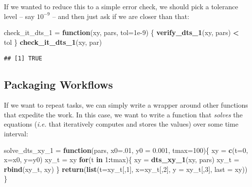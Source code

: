 \documentclass[
]{book}
\newenvironment{Shaded}{\begin{snugshade}}{\end{snugshade}}
\newcommand{\AttributeTok}[1]{\textcolor[rgb]{0.13,0.29,0.53}{#1}}
\newcommand{\ControlFlowTok}[1]{\textcolor[rgb]{0.13,0.29,0.53}{\textbf{#1}}}
\newcommand{\DecValTok}[1]{\textcolor[rgb]{0.00,0.00,0.81}{#1}}
\newcommand{\FloatTok}[1]{\textcolor[rgb]{0.00,0.00,0.81}{#1}}
\newcommand{\FunctionTok}[1]{\textcolor[rgb]{0.13,0.29,0.53}{\textbf{#1}}}
\newcommand{\NormalTok}[1]{#1}
\newcommand{\OtherTok}[1]{\textcolor[rgb]{0.56,0.35,0.01}{#1}}
\newcommand{\SpecialCharTok}[1]{\textcolor[rgb]{0.81,0.36,0.00}{\textbf{#1}}}
\begin{document}
If we wanted to reduce this to a simple error check, we should pick a tolerance level -- say \(10^{-9}\) -- and then just ask if we are closer than that:

\begin{Shaded}
\begin{Highlighting}[]
\NormalTok{check\_it\_dts\_1 }\OtherTok{=} \ControlFlowTok{function}\NormalTok{(xy, pars, }\AttributeTok{tol=}\FloatTok{1e{-}9}\NormalTok{)}
\NormalTok{\{}
  \FunctionTok{verify\_dts\_1}\NormalTok{(xy, pars) }\SpecialCharTok{\textless{}}\NormalTok{ tol}
\NormalTok{\}}
\FunctionTok{check\_it\_dts\_1}\NormalTok{(xy, par)}
\end{Highlighting}
\end{Shaded}

\begin{verbatim}
## [1] TRUE
\end{verbatim}

\subsection{Packaging Workflows}\label{packaging-workflows}

If we want to repeat tasks, we can simply write a wrapper around other functions that expedite the work. In this case, we want to write a function that \emph{solves} the equations (\emph{i.e.} that iteratively computes and stores the values) over some time interval:

\begin{Shaded}
\begin{Highlighting}[]
\NormalTok{solve\_dts\_xy\_1 }\OtherTok{=} \ControlFlowTok{function}\NormalTok{(pars, }\AttributeTok{x0=}\NormalTok{.}\DecValTok{01}\NormalTok{, }\AttributeTok{y0 =} \FloatTok{0.001}\NormalTok{, }\AttributeTok{tmax=}\DecValTok{100}\NormalTok{)\{}
\NormalTok{   xy }\OtherTok{=} \FunctionTok{c}\NormalTok{(}\AttributeTok{t=}\DecValTok{0}\NormalTok{, }\AttributeTok{x=}\NormalTok{x0, }\AttributeTok{y=}\NormalTok{y0) }
\NormalTok{   xy\_t }\OtherTok{=}\NormalTok{ xy }
   \ControlFlowTok{for}\NormalTok{(t }\ControlFlowTok{in} \DecValTok{1}\SpecialCharTok{:}\NormalTok{tmax)\{}
\NormalTok{     xy }\OtherTok{=} \FunctionTok{dts\_xy\_1}\NormalTok{(xy, pars)}
\NormalTok{     xy\_t }\OtherTok{=} \FunctionTok{rbind}\NormalTok{(xy\_t, xy)}
\NormalTok{   \}}
   \FunctionTok{return}\NormalTok{(}\FunctionTok{list}\NormalTok{(}\AttributeTok{t=}\NormalTok{xy\_t[,}\DecValTok{1}\NormalTok{], }\AttributeTok{x=}\NormalTok{xy\_t[,}\DecValTok{2}\NormalTok{], }\AttributeTok{y =}\NormalTok{ xy\_t[,}\DecValTok{3}\NormalTok{], }\AttributeTok{last =}\NormalTok{ xy)) }
\NormalTok{\}}
\end{Highlighting}
\end{Shaded}
\end{document}
